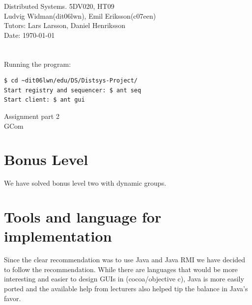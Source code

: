 \documentclass[english]{article}
\def\author			{Ludvig Widman(dit06lwn), Emil Eriksson(c07een)}
\def\course			{Distributed Systems. 5DV020, HT09}
\def\delivery		{Assignment part 2}
\def\trivialname	{GCom}
\def\tutor			{Lars Larsson, Daniel Henriksson}
\begin{document}
\begin{titlepage}
\noindent
\course \\
\author \\

\noindent
Tutors: \tutor \\
Date: \today \\
\\
\\
Running the program: 
\begin{verbatim}
$ cd ~dit06lwn/edu/DS/Distsys-Project/
Start registry and sequencer: $ ant seq
Start client: $ ant gui
\end{verbatim}

\begin{center}
	\vspace{20mm}
        \Huge \delivery \\
        \vspace{5mm}
        \Huge \trivialname \\
        \vspace{20mm}
        
\end{center}

\end{titlepage}
\thispagestyle{empty}
\tableofcontents
\newpage
{}

\setlength{\parindent}{0pt}
\setlength{\parskip}{1ex plus 0.5ex minus 0.2ex}


\section{Bonus Level}
We have solved bonus level two with dynamic groups. 


\section{Tools and language for implementation}
Since the clear recommendation was to use Java and Java RMI we have decided to follow the recommendation. While there are languages that would be more interesting and easier to design GUIs in (cocoa/objective c), Java is more easily ported and the available help from lecturers also helped tip the balance in Java's favor.
\end{document}
